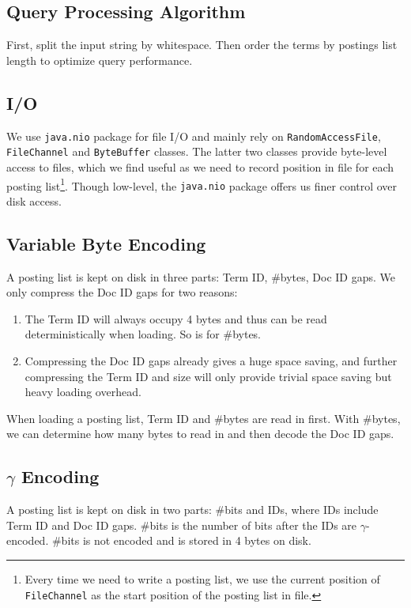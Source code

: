 \documentclass{article}
\begin{document}
\subsection{Query Processing Algorithm}

First, split the input string by whitespace. Then order the terms by postings
list length to optimize query performance.

\subsection{I/O}

We use {\texttt{java.nio}} package for file I/O and mainly rely on
{\texttt{RandomAccessFile}}, {\texttt{FileChannel}} and {\texttt{ByteBuffer}}
classes. The latter two classes provide byte-level access to files, which we
find useful as we need to record position in file for each posting
list{\footnote{Every time we need to write a posting list, we use the current
position of {\texttt{FileChannel}} as the start position of the posting list in
file.}}. Though low-level, the {\texttt{java.nio}} package offers us finer
control over disk access.

\subsection{Variable Byte Encoding}

A posting list is kept on disk in three parts: Term ID, \#bytes, Doc ID gaps.
We only compress the Doc ID gaps for two reasons:
\begin{enumerate}
  \item The Term ID will always occupy 4 bytes and thus can be read
  deterministically when loading. So is for \#bytes.
  
  \item Compressing the Doc ID gaps already gives a huge space saving, and
  further compressing the Term ID and size will only provide trivial space
  saving but heavy loading overhead.
\end{enumerate}
When loading a posting list, Term ID and \#bytes are read in first. With
\#bytes, we can determine how many bytes to read in and then decode the Doc ID
gaps.

\subsection{$\gamma$ Encoding}

A posting list is kept on disk in two parts: \#bits and IDs, where IDs include
Term ID and Doc ID gaps. \#bits is the number of bits after the IDs are
$\gamma$-encoded. \#bits is not encoded and is stored in 4 bytes on disk.
\end{document}
